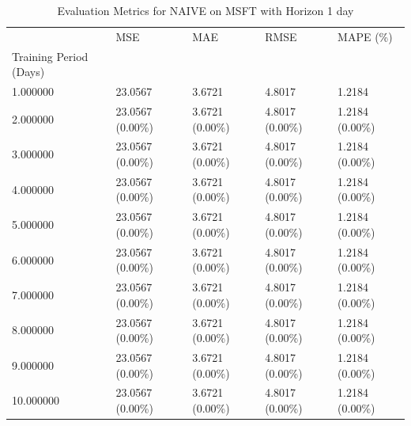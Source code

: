 \begin{table}
\caption{Evaluation Metrics for NAIVE on MSFT with Horizon 1 day}
\label{tab:naive_MSFT_h1_metrics}
\begin{tabular}{lllll}
\toprule
 & MSE & MAE & RMSE & MAPE (\%) \\
Training Period (Days) &  &  &  &  \\
\midrule
1.000000 & 23.0567 & 3.6721 & 4.8017 & 1.2184 \\
2.000000 & 23.0567 (0.00\%) & 3.6721 (0.00\%) & 4.8017 (0.00\%) & 1.2184 (0.00\%) \\
3.000000 & 23.0567 (0.00\%) & 3.6721 (0.00\%) & 4.8017 (0.00\%) & 1.2184 (0.00\%) \\
4.000000 & 23.0567 (0.00\%) & 3.6721 (0.00\%) & 4.8017 (0.00\%) & 1.2184 (0.00\%) \\
5.000000 & 23.0567 (0.00\%) & 3.6721 (0.00\%) & 4.8017 (0.00\%) & 1.2184 (0.00\%) \\
6.000000 & 23.0567 (0.00\%) & 3.6721 (0.00\%) & 4.8017 (0.00\%) & 1.2184 (0.00\%) \\
7.000000 & 23.0567 (0.00\%) & 3.6721 (0.00\%) & 4.8017 (0.00\%) & 1.2184 (0.00\%) \\
8.000000 & 23.0567 (0.00\%) & 3.6721 (0.00\%) & 4.8017 (0.00\%) & 1.2184 (0.00\%) \\
9.000000 & 23.0567 (0.00\%) & 3.6721 (0.00\%) & 4.8017 (0.00\%) & 1.2184 (0.00\%) \\
10.000000 & 23.0567 (0.00\%) & 3.6721 (0.00\%) & 4.8017 (0.00\%) & 1.2184 (0.00\%) \\
\bottomrule
\end{tabular}
\end{table}
